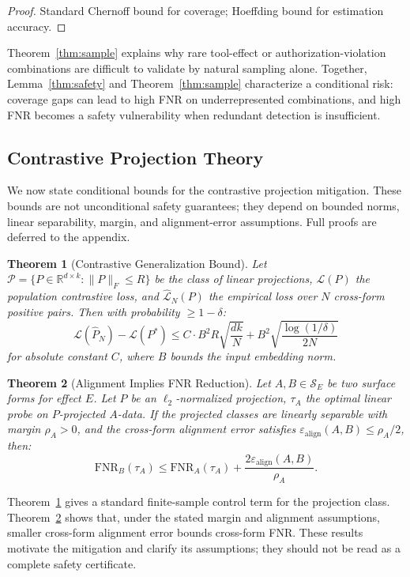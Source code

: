 \documentclass{article}
\newtheorem{theorem}{Theorem}[section]
\begin{document}
\begin{proof}
Standard Chernoff bound for coverage; Hoeffding bound for estimation accuracy.
\end{proof}

Theorem~\ref{thm:sample} explains why rare tool-effect or authorization-violation combinations are difficult to validate by natural sampling alone. Together, Lemma~\ref{thm:safety} and Theorem~\ref{thm:sample} characterize a conditional risk: coverage gaps can lead to high FNR on underrepresented combinations, and high FNR becomes a safety vulnerability when redundant detection is insufficient.

\subsection{Contrastive Projection Theory}

We now state conditional bounds for the contrastive projection mitigation. These bounds are not unconditional safety guarantees; they depend on bounded norms, linear separability, margin, and alignment-error assumptions. Full proofs are deferred to the appendix.

\begin{theorem}[Contrastive Generalization Bound]
\label{thm:contrastive}
Let $\mathcal{P} = \{P \in \mathbb{R}^{d \times k}: \|P\|_F \leq R\}$ be the class of linear projections, $\mathcal{L}(P)$ the population contrastive loss, and $\hat{\mathcal{L}}_N(P)$ the empirical loss over $N$ cross-form positive pairs. Then with probability $\geq 1-\delta$:
$$\mathcal{L}(\hat{P}_N) - \mathcal{L}(P^*) \leq C \cdot B^2 R \sqrt{\frac{dk}{N}} + B^2 \sqrt{\frac{\log(1/\delta)}{2N}}$$
for absolute constant $C$, where $B$ bounds the input embedding norm.
\end{theorem}

\begin{theorem}[Alignment Implies FNR Reduction]
\label{thm:alignment}
Let $A, B \in \mathcal{S}_E$ be two surface forms for effect $E$. Let $P$ be an $\ell_2$-normalized projection, $\tau_A$ the optimal linear probe on $P$-projected $A$-data. If the projected classes are linearly separable with margin $\rho_A > 0$, and the cross-form alignment error satisfies $\varepsilon_{\text{align}}(A, B) \leq \rho_A/2$, then:
$$\text{FNR}_B(\tau_A) \leq \text{FNR}_A(\tau_A) + \frac{2\varepsilon_{\text{align}}(A, B)}{\rho_A}.$$
\end{theorem}

Theorem~\ref{thm:contrastive} gives a standard finite-sample control term for the projection class. Theorem~\ref{thm:alignment} shows that, under the stated margin and alignment assumptions, smaller cross-form alignment error bounds cross-form FNR. These results motivate the mitigation and clarify its assumptions; they should not be read as a complete safety certificate.
\end{document}
